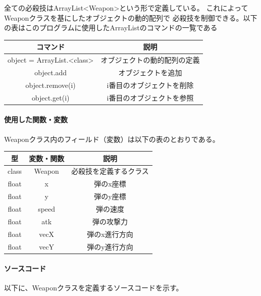 \documentclass[a4paper,titlepage,11pt]{ltjsarticle}
\begin{document}
全ての必殺技はArrayList<Weapon>という形で定義している。
これによってWeaponクラスを基にしたオブジェクトの動的配列で
必殺技を制御できる。以下の表はこのプログラムに使用したArrayListのコマンドの一覧である
\begin{table}[H]
	\begin{center}
		\begin{tabular}{|c|c|}
			\hline
			コマンド & 説明 \\ \hline \hline
			object = ArrayList.<class> & オブジェクトの動的配列の定義 \\ \hline
			object.add & オブジェクトを追加 \\ \hline
			object.remove(i) & i番目のオブジェクトを削除 \\ \hline
			object.get(i) & i番目のオブジェクトを参照 \\ \hline
		\end{tabular}
	\end{center}
\end{table}
\paragraph{使用した関数・変数}

Weaponクラス内のフィールド（変数）は以下の表のとおりである。
\begin{table}[H]
	\begin{center}
		\begin{tabular}{|c|c|c|}
			\hline
			型 & 変数・関数 & 説明 \\ \hline \hline
			class & Weapon & 必殺技を定義するクラス \\ \hline
			float & x & 弾のx座標 \\ \hline
			float & y & 弾のy座標 \\ \hline
			float & speed & 弾の速度 \\ \hline
			float & atk & 弾の攻撃力 \\ \hline
			float & vecX & 弾のx進行方向 \\ \hline
			float & vecY & 弾のy進行方向 \\ \hline
		\end{tabular}
	\end{center}
\end{table}

\paragraph{ソースコード}
以下に、Weaponクラスを定義するソースコードを示す。
\end{document}
